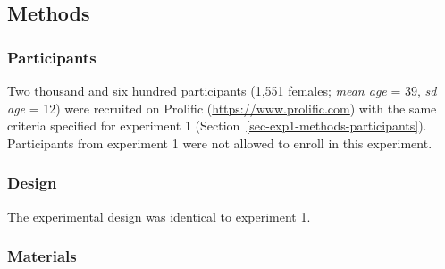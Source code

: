 \documentclass[
]{interact}
\begin{document}
\begin{table}[h]

\caption{\label{tbl-pis}Prediction intervals calculated on the
ANOVA-based means and standard deviations (SD) of the conditions tested
in experiment 1.}


\end{table}%

\subsection{Methods}\label{sec-exp2-methods}

\subsubsection{Participants}\label{sec-exp2-methods-participants}

Two thousand and six hundred participants (1,551 females; \emph{mean
age} = 39, \emph{sd age} = 12) were recruited on Prolific
(\url{https://www.prolific.com}) with the same criteria specified for
experiment 1 (Section~\ref{sec-exp1-methods-participants}). Participants
from experiment 1 were not allowed to enroll in this experiment.

\subsubsection{Design}\label{sec-exp2-methods-design}

The experimental design was identical to experiment 1.

\subsubsection{Materials}\label{sec-exp2-methods-materials}
\end{document}

